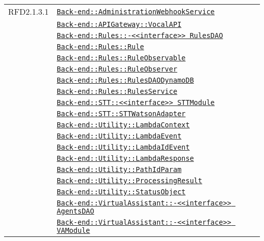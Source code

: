 \begin{longtable}{|>{\centering}m{3cm}|m{10cm}<{\centering}|}
RFD2.1.3.1 & \hyperref[Back-end::AdministrationWebhookService]{\texttt{Back-end::AdministrationWebhookService}}\\
& \hyperref[Back-end::APIGateway::VocalAPI]{\texttt{Back-end::APIGateway::VocalAPI}}\\
& \hyperref[Back-end::Rules::<<interface>> RulesDAO]{\texttt{Back-end::Rules::-\linebreak <<interface>> RulesDAO}}\\
& \hyperref[Back-end::Rules::Rule]{\texttt{Back-end::Rules::Rule}}\\
& \hyperref[Back-end::Rules::RuleObservable]{\texttt{Back-end::Rules::RuleObservable}}\\
& \hyperref[Back-end::Rules::RuleObserver]{\texttt{Back-end::Rules::RuleObserver}}\\
& \hyperref[Back-end::Rules::RulesDAODynamoDB]{\texttt{Back-end::Rules::RulesDAODynamoDB}}\\
& \hyperref[Back-end::Rules::RulesService]{\texttt{Back-end::Rules::RulesService}}\\
& \hyperref[Back-end::STT::<<interface>> STTModule]{\texttt{Back-end::STT::<<interface>> STTModule}}\\
& \hyperref[Back-end::STT::STTWatsonAdapter]{\texttt{Back-end::STT::STTWatsonAdapter}}\\
& \hyperref[Back-end::Utility::LambdaContext]{\texttt{Back-end::Utility::LambdaContext}}\\
& \hyperref[Back-end::Utility::LambdaEvent]{\texttt{Back-end::Utility::LambdaEvent}}\\
& \hyperref[Back-end::Utility::LambdaIdEvent]{\texttt{Back-end::Utility::LambdaIdEvent}}\\
& \hyperref[Back-end::Utility::LambdaResponse]{\texttt{Back-end::Utility::LambdaResponse}}\\
& \hyperref[Back-end::Utility::PathIdParam]{\texttt{Back-end::Utility::PathIdParam}}\\
& \hyperref[Back-end::Utility::ProcessingResult]{\texttt{Back-end::Utility::ProcessingResult}}\\
& \hyperref[Back-end::Utility::StatusObject]{\texttt{Back-end::Utility::StatusObject}}\\
& \hyperref[Back-end::VirtualAssistant::<<interface>> AgentsDAO]{\texttt{Back-end::VirtualAssistant::-\linebreak <<interface>> AgentsDAO}}\\
& \hyperref[Back-end::VirtualAssistant::<<interface>> VAModule]{\texttt{Back-end::VirtualAssistant::-\linebreak <<interface>> VAModule}}\\

\end{longtable}
